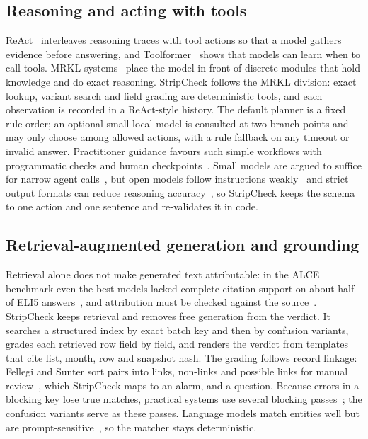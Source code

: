 \subsection{Reasoning and acting with tools}
ReAct~\cite{yao2023react} interleaves reasoning traces with tool actions so that a model gathers evidence before answering, and Toolformer~\cite{schick2023toolformer} shows that models can learn when to call tools. MRKL systems~\cite{karpas2022mrkl} place the model in front of discrete modules that hold knowledge and do exact reasoning. StripCheck follows the MRKL division: exact lookup, variant search and field grading are deterministic tools, and each observation is recorded in a ReAct-style history. The default planner is a fixed rule order; an optional small local model is consulted at two branch points and may only choose among allowed actions, with a rule fallback on any timeout or invalid answer. Practitioner guidance favours such simple workflows with programmatic checks and human checkpoints~\cite{schluntz2024building}. Small models are argued to suffice for narrow agent calls~\cite{belcak2025slm}, but open models follow instructions weakly~\cite{liu2024agentbench} and strict output formats can reduce reasoning accuracy~\cite{tam2024speak}, so StripCheck keeps the schema to one action and one sentence and re-validates it in code.

\subsection{Retrieval-augmented generation and grounding}
Retrieval alone does not make generated text attributable: in the ALCE benchmark even the best models lacked complete citation support on about half of ELI5 answers~\cite{gao2023alce}, and attribution must be checked against the source~\cite{rashkin2023ais}. StripCheck keeps retrieval and removes free generation from the verdict. It searches a structured index by exact batch key and then by confusion variants, grades each retrieved row field by field, and renders the verdict from templates that cite list, month, row and snapshot hash. The grading follows record linkage: Fellegi and Sunter sort pairs into links, non-links and possible links for manual review~\cite{fellegi1969theory}, which StripCheck maps to an alarm, \NLISTED{} and a question. Because errors in a blocking key lose true matches, practical systems use several blocking passes~\cite{winkler2006overview,christen2012survey,papadakis2020survey}; the confusion variants serve as these passes. Language models match entities well but are prompt-sensitive~\cite{peeters2025entity}, so the matcher stays deterministic.

